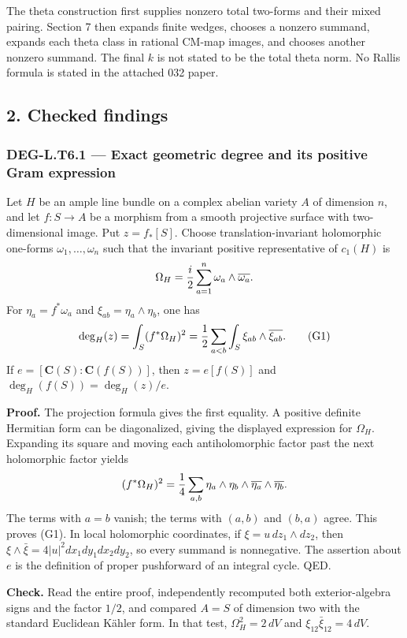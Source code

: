 The theta construction first supplies nonzero total two-forms and their mixed pairing. Section 7 then expands finite wedges, chooses a nonzero summand, expands each theta class in rational CM-map images, and chooses another nonzero summand. The final \(k\) is not stated to be the total theta norm. No Rallis formula is stated in the attached 032 paper.

\subsection{2. Checked findings}\label{checked-findings}

\subsubsection{DEG-L.T6.1 --- Exact geometric degree and its positive Gram expression}\label{DEG-L.T6.1}

Let \(H\) be an ample line bundle on a complex abelian variety \(A\) of dimension \(n\), and let \(f:S\to A\) be a morphism from a smooth projective surface with two-dimensional image. Put \(z=f_*[S]\). Choose translation-invariant holomorphic one-forms \(\omega_1,\ldots,\omega_n\) such that the invariant positive representative of \(c_1(H)\) is \[
\Omega_H={i\over2}\sum_{a=1}^n\omega_a\wedge\overline{\omega_a}.
\] For \(\eta_a=f^*\omega_a\) and \(\xi_{ab}=\eta_a\wedge\eta_b\), one has \[
\deg_H(z)=\int_S(f^*\Omega_H)^2
={1\over2}\sum_{a<b}\int_S\xi_{ab}\wedge\overline{\xi_{ab}}.
\tag{G1}
\] If \(e=[\mathbf C(S):\mathbf C(f(S))]\), then \(z=e[f(S)]\) and \(\deg_H(f(S))=\deg_H(z)/e\).

\textbf{Proof.} The projection formula gives the first equality. A positive definite Hermitian form can be diagonalized, giving the displayed expression for \(\Omega_H\). Expanding its square and moving each antiholomorphic factor past the next holomorphic factor yields \[
(f^*\Omega_H)^2={1\over4}\sum_{a,b}\eta_a\wedge\eta_b\wedge\overline{\eta_a}\wedge\overline{\eta_b}.
\] The terms with \(a=b\) vanish; the terms with \((a,b)\) and \((b,a)\) agree. This proves (G1). In local holomorphic coordinates, if \(\xi=u\,dz_1\wedge dz_2\), then \(\xi\wedge\bar\xi=4|u|^2dx_1dy_1dx_2dy_2\), so every summand is nonnegative. The assertion about \(e\) is the definition of proper pushforward of an integral cycle. QED.

\textbf{Check.} Read the entire proof, independently recomputed both exterior-algebra signs and the factor \(1/2\), and compared \(A=S\) of dimension two with the standard Euclidean Kähler form. In that test, \(\Omega_H^2=2\,dV\) and \(\xi_{12}\bar\xi_{12}=4\,dV\).

